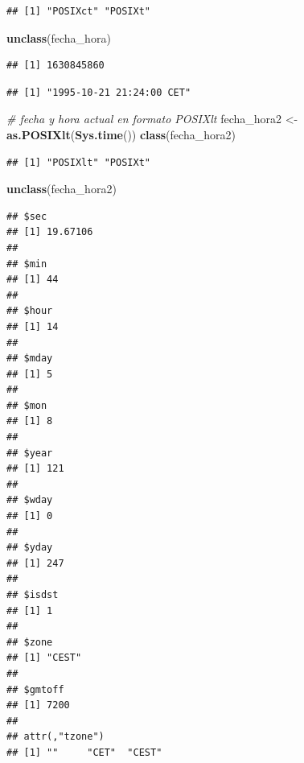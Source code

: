 \documentclass[11pt,]{book}
\newenvironment{Shaded}{\begin{snugshade}}{\end{snugshade}}
\newcommand{\CommentTok}[1]{\textcolor[rgb]{0.37,0.37,0.37}{\textit{#1}}}
\newcommand{\KeywordTok}[1]{\textcolor[rgb]{0.27,0.27,0.27}{\textbf{#1}}}
\newcommand{\NormalTok}[1]{#1}
\newcommand{\StringTok}[1]{\textcolor[rgb]{0.5,0.5,0.5}{#1}}
\begin{document}
\begin{verbatim}
## [1] "POSIXct" "POSIXt"
\end{verbatim}

\begin{Shaded}
\begin{Highlighting}[]
\KeywordTok{unclass}\NormalTok{(fecha_hora)}
\end{Highlighting}
\end{Shaded}

\begin{verbatim}
## [1] 1630845860
\end{verbatim}

\begin{Shaded}
\end{Shaded}

\begin{verbatim}
## [1] "1995-10-21 21:24:00 CET"
\end{verbatim}

\begin{Shaded}
\begin{Highlighting}[]
\CommentTok{# fecha y hora actual en formato POSIXlt}
\NormalTok{fecha_hora2 <-}\StringTok{ }\KeywordTok{as.POSIXlt}\NormalTok{(}\KeywordTok{Sys.time}\NormalTok{())}
\KeywordTok{class}\NormalTok{(fecha_hora2)}
\end{Highlighting}
\end{Shaded}

\begin{verbatim}
## [1] "POSIXlt" "POSIXt"
\end{verbatim}

\begin{Shaded}
\begin{Highlighting}[]
\KeywordTok{unclass}\NormalTok{(fecha_hora2)}
\end{Highlighting}
\end{Shaded}

\begin{verbatim}
## $sec
## [1] 19.67106
## 
## $min
## [1] 44
## 
## $hour
## [1] 14
## 
## $mday
## [1] 5
## 
## $mon
## [1] 8
## 
## $year
## [1] 121
## 
## $wday
## [1] 0
## 
## $yday
## [1] 247
## 
## $isdst
## [1] 1
## 
## $zone
## [1] "CEST"
## 
## $gmtoff
## [1] 7200
## 
## attr(,"tzone")
## [1] ""     "CET"  "CEST"
\end{verbatim}
\end{document}
